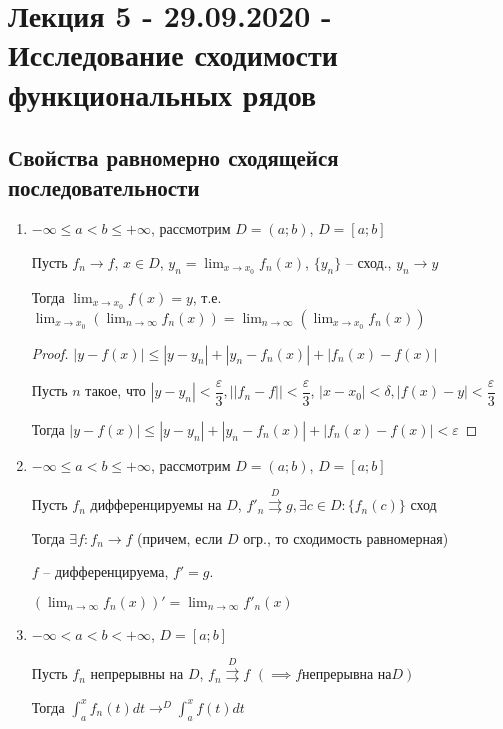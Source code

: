 \section{Лекция 5 - 29.09.2020 - Исследование сходимости функциональных рядов}
\subsection{Свойства равномерно сходящейся последовательности}
\begin{enumerate}
\item $-\infty \leq a < b \leq +\infty$, рассмотрим $D= (a; b)$, $D = [a;b]$

      Пусть $f_n \to f$, $x \in D$, $y_n = \lim_{x\to x_0} f_n(x)$, $\{y_n\}$ -- сход., $y_n \to y$

      Тогда $\lim_{x \to x_0} f(x) = y$, т.е. $\lim_{x\to x_0}(\lim_{n \to \infty} f_n(x)) = \lim_{n\to \infty} (\lim_{x \to x_0} f_n(x))$

      \begin{proof}

        $|y -f(x)| \leq |y - y_n| + |y_n - f_n(x)| + |f_n(x) - f(x)|$


        Пусть $n$ такое, что $|y - y_n| < \dfrac{\varepsilon}{3}, ||f_n - f|| < \dfrac{\varepsilon}{3}$, $|x - x_0| < \delta, |f(x) - y| < \dfrac{\varepsilon}{3}$


        Тогда $|y -f(x)| \leq |y - y_n| + |y_n - f_n(x)| + |f_n(x) - f(x)| < \varepsilon$
      \end{proof}
\item $-\infty \leq a < b \leq +\infty$, рассмотрим $D= (a; b)$, $D = [a;b]$

      Пусть $f_n$ дифференцируемы на $D$, $f'_n \overset{D}{\rightrightarrows} g, \exists c \in D: \{f_n(c)\}$ сход

      Тогда $\exists f: f_n \to f$ (причем, если $D$ огр., то сходимость равномерная)

      $f$ -- дифференцируема, $f' = g$.

      $(\lim_{n \to \infty} f_n(x))' = \lim_{n \to \infty} f'_n(x)$
\item $-\infty < a < b < +\infty$, $D=[a;b]$
      
      Пусть $f_n$ непрерывны на $D$, $f_n \overset{D}{\rightrightarrows} f$ $(\implies f \text{непрерывна на} D)$

      Тогда $\int_{a}^{x} f_n(t)dt \to^{D} \int_{a}^{x} f(t)dt$
\end{enumerate}

